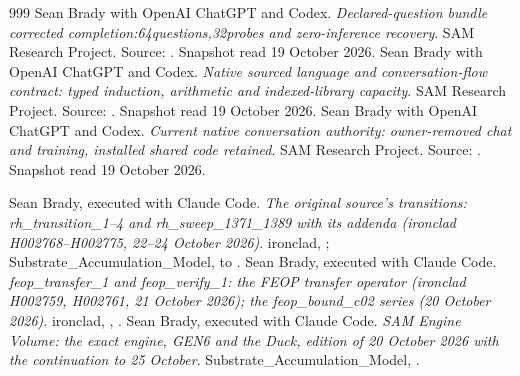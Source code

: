 \begin{thebibliography}{999}
 Sean Brady with OpenAI ChatGPT and Codex. \emph{Declared-question bundle corrected completion:64questions,32probes and zero-inference recovery}. SAM Research Project. Source: . Snapshot read 19 October 2026.
 Sean Brady with OpenAI ChatGPT and Codex. \emph{Native sourced language and conversation-flow contract: typed induction, arithmetic and indexed-library capacity}. SAM Research Project. Source: . Snapshot read 19 October 2026.
 Sean Brady with OpenAI ChatGPT and Codex. \emph{Current native conversation authority: owner-removed chat and training, installed shared code retained}. SAM Research Project. Source: . Snapshot read 19 October 2026.

 Sean Brady, executed with Claude Code. \emph{The original source's transitions: rh\_transition\_1--4 and rh\_sweep\_1371\_1389 with its addenda (ironclad H002768--H002775, 22--24 October 2026)}. ironclad, ; Substrate\_Accumulation\_Model,  to .
 Sean Brady, executed with Claude Code. \emph{feop\_transfer\_1 and feop\_verify\_1: the FEOP transfer operator (ironclad H002759, H002761, 21 October 2026); the feop\_bound\_c02 series (20 October 2026)}. ironclad, , .
 Sean Brady, executed with Claude Code. \emph{SAM Engine Volume: the exact engine, GEN6 and the Duck, edition of 20 October 2026 with the continuation to 25 October}. Substrate\_Accumulation\_Model, .
\end{thebibliography}
\endgroup
